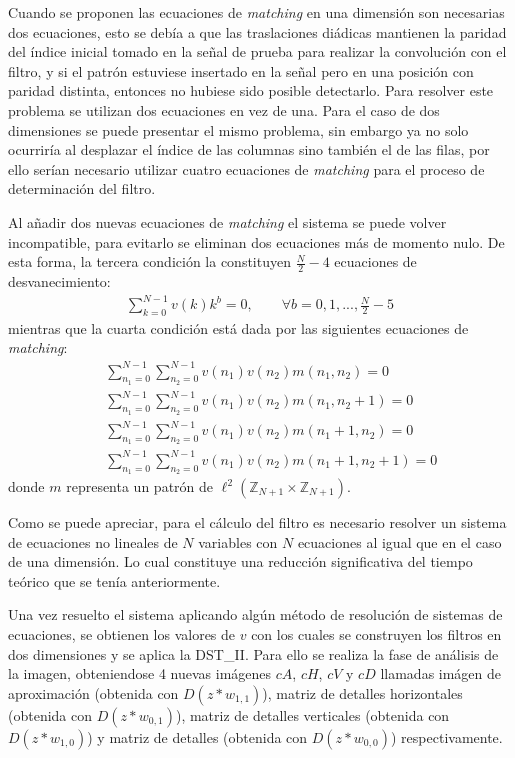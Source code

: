 \par Cuando se proponen las ecuaciones de \textit{matching} en una dimensi\'on son necesarias dos ecuaciones, esto se deb\'ia a que las traslaciones di\'adicas mantienen la paridad del \'indice inicial tomado en la se\~nal de prueba para realizar la convoluci\'on con el filtro, y si el patr\'on estuviese insertado en la se\~nal pero en una posici\'on con paridad distinta, entonces no hubiese sido posible detectarlo. Para resolver este problema se utilizan dos ecuaciones en vez de una. Para el caso de dos dimensiones se puede presentar el mismo problema, sin embargo ya no solo ocurrir\'ia al desplazar el \'indice de las columnas sino tambi\'en el de las filas, por ello ser\'ian necesario utilizar cuatro ecuaciones de \textit{matching} para el proceso de determinaci\'on del filtro.
\par Al a\~nadir dos nuevas ecuaciones de \textit{matching} el sistema se puede volver incompatible, para evitarlo se eliminan dos ecuaciones m\'as de momento nulo. De esta forma, la tercera condici\'on la constituyen $\frac{N}{2}-4$ ecuaciones de desvanecimiento:
\begin{eqnarray}
\sum_{k=0}^{N-1}v(k)k^b=0,\qquad\forall b=0,1,...,\frac{N}{2}-5\nonumber
\end{eqnarray}
mientras que la cuarta condici\'on est\'a dada por las siguientes ecuaciones de \textit{matching}:
\begin{eqnarray}
&&\sum_{n_1=0}^{N-1}\sum_{n_2=0}^{N-1}v(n_1)v(n_2)m(n_1,n_2)=0\nonumber\\
&&\sum_{n_1=0}^{N-1}\sum_{n_2=0}^{N-1}v(n_1)v(n_2)m(n_1,n_2+1)=0\nonumber\\
&&\sum_{n_1=0}^{N-1}\sum_{n_2=0}^{N-1}v(n_1)v(n_2)m(n_1+1,n_2)=0\nonumber\\
&&\sum_{n_1=0}^{N-1}\sum_{n_2=0}^{N-1}v(n_1)v(n_2)m(n_1+1,n_2+1)=0\nonumber
\end{eqnarray}
donde $m$ representa un patr\'on de $\ell^2(\mathbb{Z}_{N+1}\times\mathbb{Z}_{N+1})$.\\

\par Como se puede apreciar, para el c\'alculo del filtro es necesario resolver un sistema de ecuaciones no lineales de $N$ variables con $N$ ecuaciones al igual que en el caso de una dimensi\'on. Lo cual constituye una reducci\'on significativa del tiempo te\'orico que se ten\'ia anteriormente.\\

\par Una vez resuelto el sistema aplicando alg\'un m\'etodo de resoluci\'on de sistemas de ecuaciones, se obtienen los valores de $v$ con los cuales se construyen los filtros en dos dimensiones y se aplica la DST\_II. Para ello se realiza la fase de an\'alisis de la imagen, obteniendose 4 nuevas im\'agenes $cA$, $cH$, $cV$ y $cD$ llamadas im\'agen de aproximaci\'on (obtenida con $D(z\ast w_{1,1})$), matriz de detalles horizontales (obtenida con $D(z\ast w_{0,1})$), matriz de detalles verticales (obtenida con $D(z\ast w_{1,0})$) y matriz de detalles (obtenida con $D(z\ast w_{0,0})$) respectivamente.

